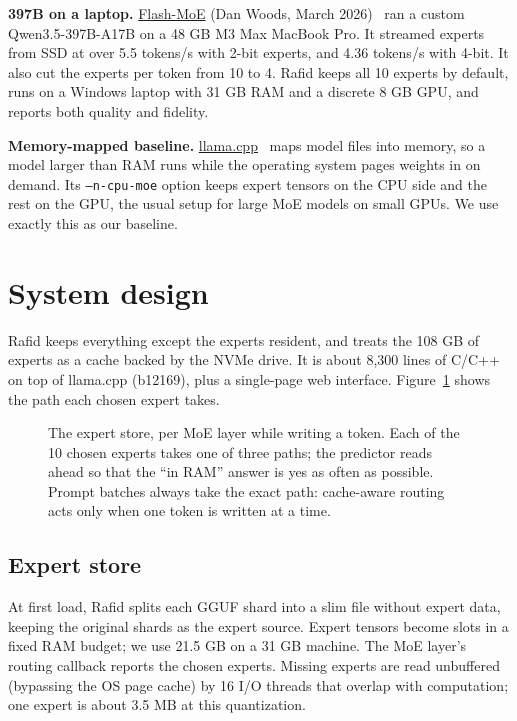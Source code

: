\textbf{397B on a laptop.} \href{https://simonwillison.net/b/9337}{Flash-MoE} (Dan Woods, March 2026)~\cite{woods2026} ran a custom Qwen3.5-397B-A17B on a 48 GB M3 Max MacBook Pro. It streamed experts from SSD at over 5.5 tokens/s with 2-bit experts, and 4.36 tokens/s with 4-bit. It also cut the experts per token from 10 to 4. Rafid keeps all 10 experts by default, runs on a Windows laptop with 31 GB RAM and a discrete 8 GB GPU, and reports both quality and fidelity.

\textbf{Memory-mapped baseline.} \href{https://github.com/ggml-org/llama.cpp}{llama.cpp}~\cite{llamacpp} maps model files into memory, so a model larger than RAM runs while the operating system pages weights in on demand. Its \texttt{--n-cpu-moe} option keeps expert tensors on the CPU side and the rest on the GPU, the usual setup for large MoE models on small GPUs. We use exactly this as our baseline.

\section{System design}\label{sec:design}
Rafid keeps everything except the experts resident, and treats the 108 GB of experts as a cache backed by the NVMe drive. It is about 8,300 lines of C/C++ on top of llama.cpp (b12169), plus a single-page web interface. Figure~\ref{fig:store} shows the path each chosen expert takes.

\begin{figure}[t]
\centering

\caption{The expert store, per MoE layer while writing a token. Each of the 10 chosen experts takes one of three paths; the predictor reads ahead so that the ``in RAM'' answer is yes as often as possible. Prompt batches always take the exact path: cache-aware routing acts only when one token is written at a time.}
\label{fig:store}
\end{figure}


\subsection{Expert store}
At first load, Rafid splits each GGUF shard into a slim file without expert data, keeping the original shards as the expert source. Expert tensors become slots in a fixed RAM budget; we use 21.5 GB on a 31 GB machine. The MoE layer's routing callback reports the chosen experts. Missing experts are read unbuffered (bypassing the OS page cache) by 16 I/O threads that overlap with computation; one expert is about 3.5 MB at this quantization.

